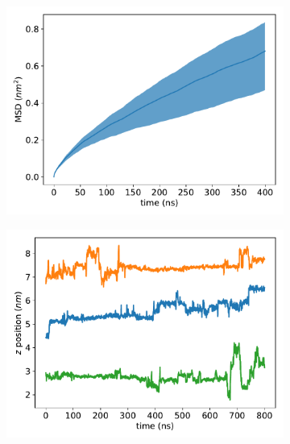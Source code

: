\documentclass{article}
\begin{document}
  \begin{figure}
  \centering
  \begin{subfigure}{0.49\textwidth}
  \includegraphics[width=\linewidth]{example_msd.pdf}
  \caption{}\label{fig:example_msd}
  \end{subfigure}
  \begin{subfigure}{0.49\textwidth}
  \includegraphics[width=\linewidth]{example_ztraces.pdf}
  \caption{}\label{fig:example_ztraces}
  \end{subfigure}
  \par\medskip
  \begin{subfigure}{0.325\textwidth}

\end{subfigure}
\end{figure}
\end{document}
